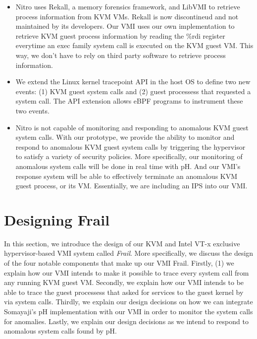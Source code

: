 \documentclass{report}
\begin{document}
\begin{spacing}{1.5}
{\begin{itemize}
  \item Nitro uses Rekall, a memory forensics framework, and LibVMI to retrieve process information from KVM VMs. Rekall is now discontineud and not maintained by its developers. Our VMI uses our own implementation to retrieve KVM guest process information by reading the \%rdi register everytime an exec family system call is executed on the KVM guest VM. This way, we don't have to rely on third party software to retrieve process information.
  
  \item We extend the Linux kernel tracepoint API in the host OS to define two new events: (1) KVM guest system calls and (2) guest processess that requested a system call. The API extension allows eBPF programs to instrument these two events.
  
  \item Nitro is not capable of monitoring and responding to anomalous KVM guest system calls. With our prototype, we provide the ability to monitor and respond to anomalous KVM guest system calls by triggering the hypervisor to satisfy a variety of security policies. More specifically, our monitoring of anomalous system calls will be done in real time with pH. And our VMI's response system will be able to effectively terminate an anomalous KVM guest process, or its VM. Essentially, we are including an IPS into our VMI.
\newline  
\end{itemize}
}

























\chapter{Designing Frail}

{\large
In this section, we introduce the design of our KVM and Intel VT-x exclusive hypervisor-based VMI system called \textit{Frail}. More specifically, we discuss the design of the four notable components that make up our VMI Frail. Firstly, (1) we explain how our VMI intends to make it possible to trace every system call from any running KVM guest VM. Secondly, we explain how our VMI intends to be able to trace the guest processess that asked for services to the guest kernel by via system calls. Thirdly, we explain our design decisions on how we can integrate Somayaji's pH implementation with our VMI in order to monitor the system calls for anomalies. Lastly, we explain our design decisions as we intend to respond to anomalous system calls found by pH. 
\newline
}


\end{spacing}
\end{document}
